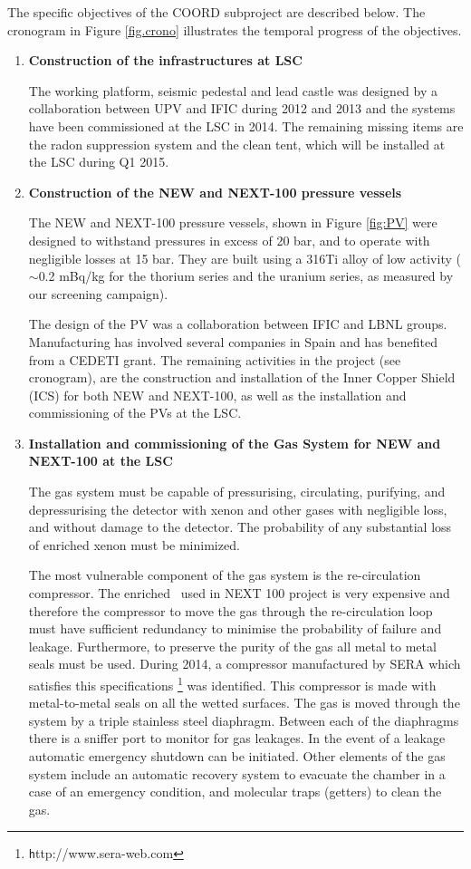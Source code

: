 The specific objectives of the COORD subproject are described below. The cronogram in Figure \ref{fig.crono} illustrates the temporal progress of the objectives. 
\begin{enumerate}
\item 
{\bf  Construction of the infrastructures at LSC}

The working platform, seismic pedestal and lead castle was designed by a collaboration between UPV and IFIC during 2012 and 2013 and the systems have been commissioned at the LSC in 2014. The remaining missing items are the radon suppression system and the clean tent, which will be installed at the LSC during Q1 2015. 

\item {\bf Construction of the NEW and NEXT-100 pressure vessels}

The NEW and NEXT-100 pressure vessels, shown in Figure \ref{fig:PV} were designed to withstand pressures in excess of 20 bar, and to operate with negligible losses at 15 bar. They are built using a 316Ti alloy of low activity ($\sim$0.2 mBq/kg for the thorium series and 
the uranium series, as measured by our screening campaign). 

The design of the PV was a collaboration between IFIC and LBNL groups. Manufacturing has involved several companies in Spain and has benefited from a CEDETI grant. The remaining activities in the project (see cronogram), are the construction and installation of the Inner Copper Shield (ICS) for both NEW and NEXT-100, as well as the installation and commissioning of the PVs at the LSC.

\item {\bf Installation and commissioning of the Gas System for NEW and NEXT-100 at the LSC}

The gas system must be capable of pressurising, circulating, purifying, and depressurising the detector with xenon and other gases with negligible loss, and without damage to the detector. The probability of any substantial loss of enriched xenon must be minimized. 

The most vulnerable component of the gas system is the re-circulation compressor.
The enriched \Xe\ used in NEXT 100 project is very expensive and therefore the compressor to move the gas through the re-circulation loop
must have sufficient redundancy to minimise the probability of failure and leakage. 
Furthermore, to preserve the purity of the gas all metal to metal seals must be used. During 2014, a  compressor manufactured by SERA which satisfies this specifications \footnote{\texttt http://www.sera-web.com} was identified.
This compressor is made with metal-to-metal seals on all the wetted surfaces. The gas is moved through the system by a triple stainless steel diaphragm. Between each
of the diaphragms there is a sniffer port to monitor for gas leakages. In the event of a leakage automatic emergency shutdown can be initiated.
Other elements of the gas system include an automatic recovery system 
to evacuate the chamber in a case of an emergency condition, and molecular traps (getters) to clean the gas. 


\end{enumerate}
